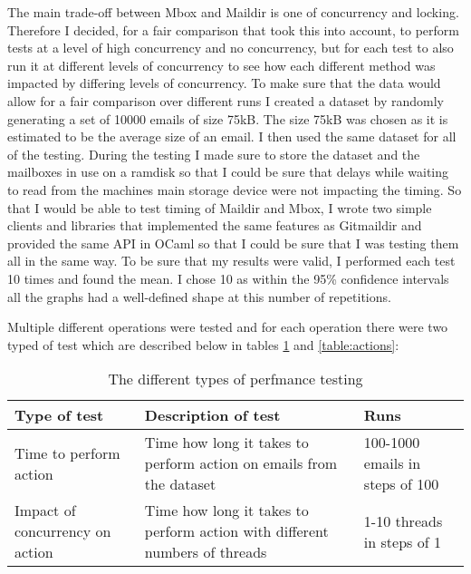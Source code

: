 The main trade-off between Mbox and Maildir is one of concurrency and locking. Therefore I decided, for a fair comparison that took this into account, to perform tests at a level of high concurrency and no concurrency, but for each test to also run it at different levels of concurrency to see how each different method was impacted by differing levels of concurrency. To make sure that the data would allow for a fair comparison over different runs I created a dataset by randomly generating a set of 10000 emails of size 75kB. The size 75kB was chosen as it is estimated to be the average size of an email\cite{email_size}. I then used the same dataset for all of the testing. During the testing I made sure to store the dataset and the mailboxes in use on a ramdisk so that I could be sure that delays while waiting to read from the machines main storage device were not impacting the timing. So that I would be able to test timing of Maildir and Mbox, I wrote two simple clients and libraries that implemented the same features as Gitmaildir and provided the same API in OCaml so that I could be sure that I was testing them all in the same way. To be sure that my results were valid, I performed each test 10 times and found the mean. I chose 10 as within the 95\% confidence intervals all the graphs had a well-defined shape at this number of repetitions.

Multiple different operations were tested and for each operation there were two typed of test which are described below in tables \ref{table:tests} and \ref{table:actions}:

\begin{table}[h]
\centering
\begin{tabular}{p{3.5cm} p{7.5cm} p{3cm}}
  \toprule
  Type of test & Description of test & Runs \\
  \midrule
  Time to perform action & Time how long it takes to perform action on emails from the dataset & 100-1000 emails in steps of 100 \\
  Impact of concurrency on action & Time how long it takes to perform action with different numbers of threads & 1-10 threads in steps of 1 \\
  \bottomrule
\end{tabular}
\caption{The different types of perfmance testing}
\label{table:tests}
\end{table}

